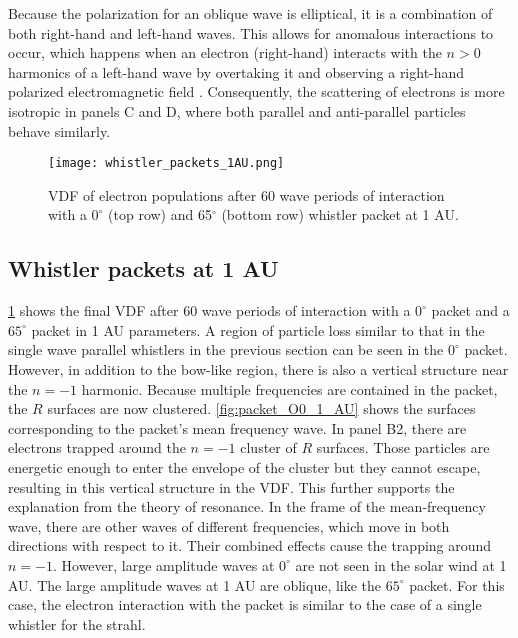 Because the polarization for an oblique wave is elliptical, it is a
combination of both right-hand and left-hand waves. This allows for anomalous
interactions to occur, which happens when an electron (right-hand) interacts
with the $n>0$ harmonics of a left-hand wave by overtaking it
and observing a right-hand polarized electromagnetic field
\citep{Tsurutani1997}. Consequently, the scattering of electrons is more
isotropic in panels C and D, where both parallel and anti-parallel particles behave similarly.

\begin{figure}
    \centering
    \texttt{[image: whistler\_packets\_1AU.png]}
    \caption{VDF of electron populations after 60 wave periods of interaction
        with a $0^\circ$ (top row) and 65$^\circ$ (bottom row) whistler packet at 1 AU.}
\label{fig:whistler_packets_1AU}
\end{figure}

\subsection{Whistler packets at 1 AU}


\cref{fig:whistler_packets_1AU} shows the final VDF after 60 wave periods of
interaction with a $0^\circ$ packet and a $65^\circ$ packet in 1 AU parameters. A region of particle loss similar to that in the single wave parallel whistlers in the previous section can be seen in the $0^\circ$ packet. However, in addition to the bow-like region, there is also a vertical structure near the $n=-1$ harmonic. Because multiple frequencies are contained in the packet, the $R$ surfaces are now clustered. \cref{fig:packet_O0_1_AU} shows the surfaces corresponding to the packet's mean frequency wave. In panel B2, there are electrons trapped around the $n=-1$ cluster of $R$ surfaces. Those particles are energetic enough to enter the envelope of the cluster but they cannot escape, resulting in this vertical structure in the VDF. This further supports the explanation from the theory of resonance. In the frame of the mean-frequency
wave, there are other waves of different frequencies, which move in both
directions with respect to it. Their combined effects cause the trapping
around $n=-1$. However, large amplitude waves at $0^\circ$ are not seen in
the solar wind at 1 AU. The large amplitude waves at 1 AU are oblique, like the
$65^\circ$ packet. For this case, the electron interaction with the packet
is similar to the case of a single whistler for the strahl.

